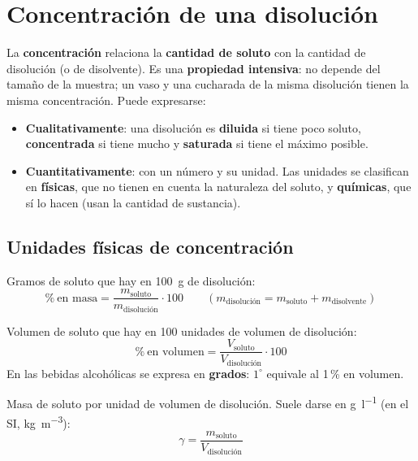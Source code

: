 \section{Concentración de una disolución}\label{sec:ud2-concentracion}

La \textbf{concentración} relaciona la \textbf{cantidad de soluto} con la cantidad de disolución (o de disolvente). Es una
\textbf{propiedad intensiva}: no depende del tamaño de la muestra; un vaso y una cucharada de la misma disolución tienen la misma
concentración. Puede expresarse:

\begin{itemize}
    \item \textbf{Cualitativamente}: una disolución es \textbf{diluida} si tiene poco soluto, \textbf{concentrada} si tiene mucho y
    \textbf{saturada} si tiene el máximo posible.
    \item \textbf{Cuantitativamente}: con un número y su unidad. Las unidades se clasifican en \textbf{físicas}, que no tienen en
    cuenta la naturaleza del soluto, y \textbf{químicas}, que sí lo hacen (usan la cantidad de sustancia).
\end{itemize}

\subsection{Unidades físicas de concentración}

\begin{definition}
    Gramos de soluto que hay en \qty{100}{\gram} de disolución:
    \[ \%\ \text{en masa} = \frac{m_{\text{soluto}}}{m_{\text{disolución}}} \cdot 100 \qquad (m_{\text{disolución}} = m_{\text{soluto}} + m_{\text{disolvente}}) \]
\end{definition}

\begin{definition}
    Volumen de soluto que hay en 100 unidades de volumen de disolución:
    \[ \%\ \text{en volumen} = \frac{V_{\text{soluto}}}{V_{\text{disolución}}} \cdot 100 \]
    En las bebidas alcohólicas se expresa en \textbf{grados}: \(1^{\circ}\) equivale al 1\,\% en volumen.
\end{definition}

\begin{definition}
    Masa de soluto por unidad de volumen de disolución. Suele darse en \unit{\gram\per\litre} (en el SI, \unit{\kilo\gram\per\cubic\metre}):
    \[ \gamma = \frac{m_{\text{soluto}}}{V_{\text{disolución}}} \]
\end{definition}

